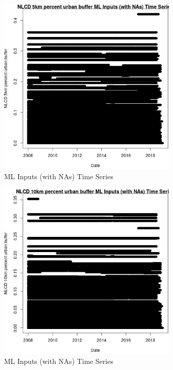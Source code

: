 \begin{figure} 
\centering  
\includegraphics[width=0.77\textwidth]{Code_Outputs/Report_ML_input_PM25_Step4_part_e_de_duplicated_aves_compiled_2019-05-21wNAs_NLCD_5km_percent_urban_buffervDate.jpg} 
\caption{\label{fig:Report_ML_input_PM25_Step4_part_e_de_duplicated_aves_compiled_2019-05-21wNAsNLCD_5km_percent_urban_buffervDate}ML Inputs (with NAs) Time Series} 
\end{figure} 
 

\begin{figure} 
\centering  
\includegraphics[width=0.77\textwidth]{Code_Outputs/Report_ML_input_PM25_Step4_part_e_de_duplicated_aves_compiled_2019-05-21wNAs_NLCD_10km_percent_urban_buffervDate.jpg} 
\caption{\label{fig:Report_ML_input_PM25_Step4_part_e_de_duplicated_aves_compiled_2019-05-21wNAsNLCD_10km_percent_urban_buffervDate}ML Inputs (with NAs) Time Series} 
\end{figure} 
 

